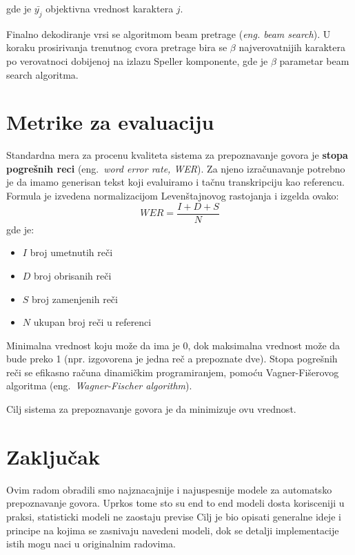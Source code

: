 \documentclass[a4paper]{article}
\begin{document}
gde je $\bar{y_j}$ objektivna vrednost karaktera $j$.

Finalno dekodiranje vrsi se algoritmom beam pretrage (\textit{eng.  beam search}).  U koraku prosirivanja trenutnog cvora pretrage bira se $\beta$ najverovatnijih karaktera po verovatnoci dobijenoj na izlazu Speller komponente,  gde je $\beta$ parametar beam search algoritma.

\section{Metrike za evaluaciju}
Standardna mera za procenu kvaliteta sistema za prepoznavanje govora je \textbf{stopa pogrešnih reci} (eng.~{\em word error rate, WER}).
Za njeno izračunavanje potrebno je da imamo generisan tekst koji evaluiramo i tačnu transkripciju kao referencu.
Formula je izvedena normalizacijom Levenštajnovog rastojanja i izgelda ovako:
\begin{equation*}
  WER = \frac{I + D + S}{N}
\end{equation*}
gde je:
\begin{itemize}
  \item $I$ broj umetnutih reči
  \item $D$ broj obrisanih reči
  \item $S$ broj zamenjenih reči
  \item $N$ ukupan broj reči u referenci
\end{itemize}
Minimalna vrednost koju može da ima je 0, dok maksimalna vrednost može da bude preko 1 (npr. izgovorena je jedna reč a prepoznate dve).
Stopa pogrešnih reči se efikasno računa dinamičkim programiranjem, pomoću Vagner-Fišerovog algoritma (eng.~{\em Wagner-Fischer algorithm}). %

Cilj sistema za prepoznavanje govora je da minimizuje ovu vrednost.

\newpage
\section{Zaključak}
\label{sec:zakljucak}

Ovim radom obradili smo najznacajnije i najuspesnije modele za automatsko prepoznavanje govora.  Uprkos tome sto su end to end modeli dosta korisceniji u praksi,  statisticki modeli ne zaostaju previse Cilj je bio opisati generalne ideje i principe na kojima se zasnivaju navedeni modeli,  dok se detalji implementacije istih mogu naci u originalnim radovima. 
\end{document}
